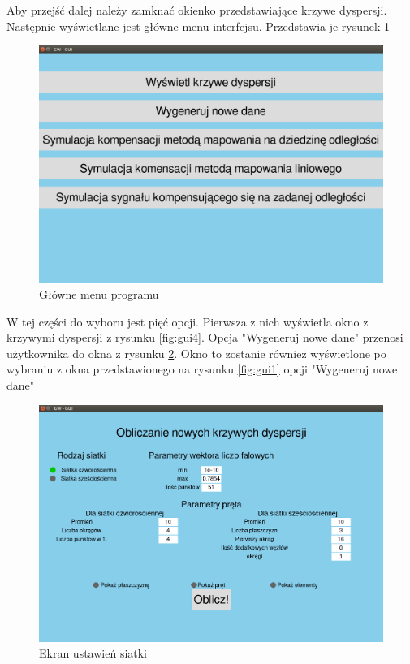 Aby przejść dalej należy zamknać okienko przedstawiające krzywe dyspersji. Następnie wyświetlane jest główne menu interfejsu. Przedstawia je rysunek \ref{fig:gui6}

\begin{figure}[h]
\centering
\includegraphics[width=13cm]{Zdjecia/5/kasia/gui6}
\caption{Główne menu programu}
\label{fig:gui6}
\end{figure}

W tej części do wyboru jest pięć opcji. Pierwsza z nich wyświetla okno z krzywymi dyspersji z rysunku \ref{fig:gui4}. Opcja "Wygeneruj nowe dane" przenosi użytkownika do okna z rysunku \ref{fig:gui7}. Okno to zostanie również wyświetlone po wybraniu z okna przedstawionego na rysunku \ref{fig:gui1} opcji "Wygeneruj nowe dane"

\begin{figure}[h]
\centering
\includegraphics[width=13cm]{Zdjecia/5/kasia/gui7}
\caption{Ekran ustawień siatki}
\label{fig:gui7}
\end{figure}

